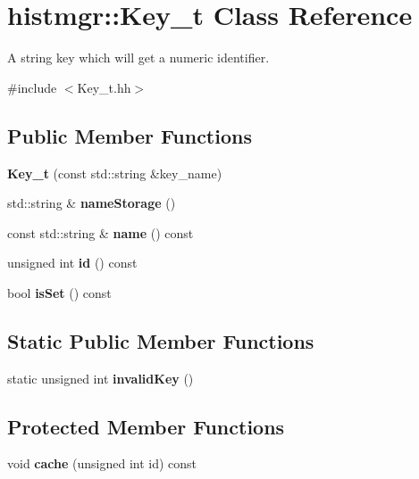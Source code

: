 \section{histmgr\-:\-:Key\-\_\-t Class Reference}
\label{classhistmgr_1_1Key__t}


A string key which will get a numeric identifier.  




{\ttfamily \#include $<$Key\-\_\-t.\-hh$>$}

\subsection*{Public Member Functions}
\begin{DoxyCompactItemize}
\item 
{\bfseries Key\-\_\-t} (const std\-::string \&key\-\_\-name)\label{classhistmgr_1_1Key__t_afce4e8a705f0f1a672177ba34000df14}

\item 
std\-::string \& {\bfseries name\-Storage} ()\label{classhistmgr_1_1Key__t_ae94241f0863c94f48c8de3526b21a5ef}

\item 
const std\-::string \& {\bfseries name} () const \label{classhistmgr_1_1Key__t_afb953f811ee1274e7d8c96800760dcd1}

\item 
unsigned int {\bfseries id} () const \label{classhistmgr_1_1Key__t_a46ee73330ff61b8d100edad91614a6eb}

\item 
bool {\bfseries is\-Set} () const \label{classhistmgr_1_1Key__t_aa09f615fc00440b4a56902a3d3076d61}

\end{DoxyCompactItemize}
\subsection*{Static Public Member Functions}
\begin{DoxyCompactItemize}
\item 
static unsigned int {\bfseries invalid\-Key} ()\label{classhistmgr_1_1Key__t_a3f76a8ecb4e1226f9e598199d0c194a0}

\end{DoxyCompactItemize}
\subsection*{Protected Member Functions}
\begin{DoxyCompactItemize}
\item 
void {\bfseries cache} (unsigned int id) const \label{classhistmgr_1_1Key__t_a27779ea465a99d049b4e7f388b4ab3e5}

\end{DoxyCompactItemize}
